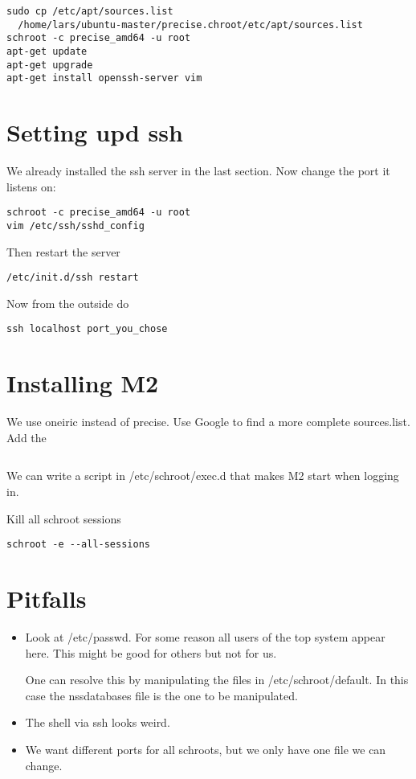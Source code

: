 \documentclass[a4paper]{article}
\begin{document}
\begin{verbatim}
sudo cp /etc/apt/sources.list 
  /home/lars/ubuntu-master/precise.chroot/etc/apt/sources.list
schroot -c precise_amd64 -u root
apt-get update
apt-get upgrade
apt-get install openssh-server vim
\end{verbatim}

\section{Setting upd ssh}

We already installed the ssh server in the last section. Now change the port it listens on:

\begin{verbatim}
schroot -c precise_amd64 -u root
vim /etc/ssh/sshd_config
\end{verbatim}

Then restart the server

\begin{verbatim}
/etc/init.d/ssh restart
\end{verbatim}

Now from the outside do

\begin{verbatim}
ssh localhost port_you_chose
\end{verbatim}

\section{Installing M2}

We use oneiric instead of precise.
Use Google to find a more complete sources.list.
Add the

\begin{verbatim}

\end{verbatim}

We can write a script in /etc/schroot/exec.d that makes M2 start when logging in.

Kill all schroot sessions

\begin{verbatim}
schroot -e --all-sessions
\end{verbatim}

\section{Pitfalls}
\begin{itemize}
\item Look at /etc/passwd. For some reason all users of the top system appear here. This might be good for others but not for us.

One can resolve this by manipulating the files in /etc/schroot/default. In this case the nssdatabases file is the one to be manipulated.
\item The shell via ssh looks weird.
\item We want different ports for all schroots, but we only have one file we can change.
\end{itemize}
\end{document}
